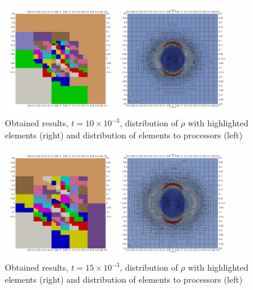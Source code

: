 \begin{figure}[H]
	\begin{center}
		\includegraphics[width=0.87\textwidth]{img//mhd-blast/old/mya3.jpg}
	\caption{Obtained results, $t = 10\times 10^{-3}$, distribution of $\rho$ with highlighted elements (right) and distribution of elements to processors (left)}
	\label{figure:blastOldMyAdapt3}
	\end{center}
\end{figure}
\vspace{-8mm}

\begin{figure}[H]
	\begin{center}
		\includegraphics[width=0.87\textwidth]{img//mhd-blast/old/mya4.jpg}
	\caption{Obtained results, $t = 15\times 10^{-3}$, distribution of $\rho$ with highlighted elements (right) and distribution of elements to processors (left)}
	\label{figure:blastOldMyAdapt4}
	\end{center}
\end{figure}
\vspace{-8mm}

